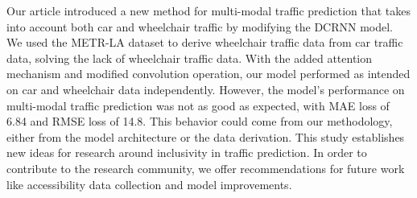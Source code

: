 Our article introduced a new method for multi-modal traffic prediction that takes into account both car and wheelchair
traffic by modifying the DCRNN model.
We used the METR-LA dataset to derive wheelchair traffic data from car traffic data, solving the lack of wheelchair
traffic data.
With the added attention mechanism and modified convolution operation, our model performed as intended on car and
wheelchair data independently.
However, the model's performance on multi-modal traffic prediction was not as good as expected, with MAE loss of 6.84
and RMSE loss of 14.8.
This behavior could come from our methodology, either from the model architecture or the data derivation.
This study establishes new ideas for research around inclusivity in traffic prediction.
In order to contribute to the research community, we offer recommendations for future work like accessibility data
collection and model improvements.
\vspace{1em}